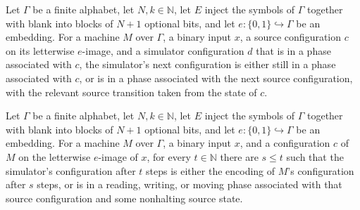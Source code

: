 \begin{lemma}
\label{Turing.FinTM.arSpacePhase_step}
\leanok
{}
Let $\Gamma$ be a finite alphabet, let $N,k\in\mathbb{N}$, let $E$ inject the symbols of
$\Gamma$ together with blank into blocks of $N+1$ optional bits, and let
$e:\{0,1\}\hookrightarrow\Gamma$ be an embedding. For a machine $M$ over $\Gamma$, a
binary input $x$, a source configuration $c$ on its letterwise $e$-image, and a
simulator configuration $d$ that is in a phase associated with $c$, the simulator's next
configuration is either still in a phase associated with $c$, or is in a phase
associated with the next source configuration, with the relevant source transition taken
from the state of $c$.
\end{lemma}

\begin{lemma}
\label{Turing.FinTM.arSpacePhase_run}
\leanok
{}
Let $\Gamma$ be a finite alphabet, let $N,k\in\mathbb{N}$, let $E$ inject the symbols of
$\Gamma$ together with blank into blocks of $N+1$ optional bits, and let
$e:\{0,1\}\hookrightarrow\Gamma$ be an embedding. For a machine $M$ over $\Gamma$, a
binary input $x$, and a configuration $c$ of $M$ on the letterwise $e$-image of $x$, for
every $t\in\mathbb{N}$ there are $s\le t$ such that the simulator's configuration after
$t$ steps is either the encoding of $M$'s configuration after $s$ steps, or is in a
reading, writing, or moving phase associated with that source configuration and some
nonhalting source state.
\end{lemma}

